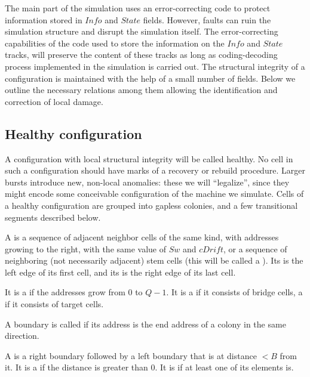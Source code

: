 \documentclass[12pt]{memoir}
\newcommand{\fld}[1]{\ensuremath{\textit{#1}}}
\def\B{B}
\newcommand{\cDrift}{\fld{cDrift}}
\newcommand{\Info}{\fld{Info}}
\newcommand{\State}{\fld{State}}
\newcommand{\Sweep}{\fld{Sw}}
\begin{document}
The main part of the simulation uses an error-correcting
code to protect information stored in \( \Info \) and \( \State \) fields.
However, faults can ruin the simulation structure and disrupt the simulation itself.
The error-correcting capabilities of the code 
used to store the information on the \( \Info \) and
\( \State \) tracks, will preserve the content of these tracks as long as coding-decoding
process implemented in the simulation is carried out.
The structural integrity of a configuration is maintained with the help of a small number
of fields.
Below we outline the necessary relations among them 
allowing the identification and correction of local damage.

\subsection{Healthy configuration}

A configuration with local structural integrity will be called healthy.
No cell in such a configuration should have marks of a recovery or
rebuild procedure.
Larger bursts introduce new, non-local anomalies: 
these we will ``legalize'', since they might encode
some conceivable configuration of the machine we simulate.
Cells of a healthy configuration are grouped into gapless colonies, and 
a few transitional segments described below.

\begin{definition}[Segments]\label{def:segments}
    A  is a sequence of adjacent neighbor cells of the same kind,
with addresses growing to the right, with the same value of \( \Sweep \)
and \( \cDrift \),
or a sequence of neighboring (not necessarily adjacent) 
stem cells (this will be called a ).
Its  is the left edge of its first cell, and its  is 
the right edge of its last cell.

It is a  if the addresses grow from \( 0 \) to \( Q-1 \).
It is a  if it consists of bridge cells, a  if it consists of target cells.

A boundary is called  if its address is the end 
address of a colony in the same direction.

A  
is a right boundary followed by a left boundary that is at distance \( <\B \) from it.
It is a  if the distance is greater than 0.
It is  if at least one of its elements is.
\end{definition}
\end{document}
